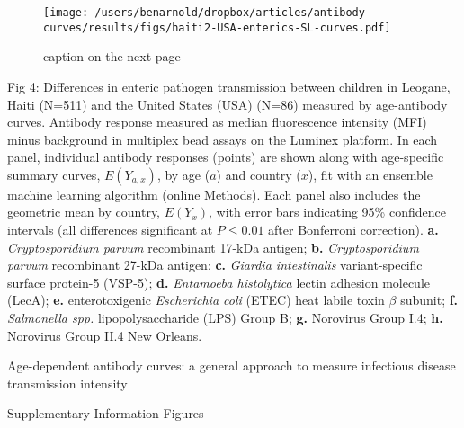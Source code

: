 \documentclass[11pt]{article}
\begin{document}
\begin{figure}[htbp]
\begin{center}
\texttt{[image: /users/benarnold/dropbox/articles/antibody-curves/results/figs/haiti2-USA-enterics-SL-curves.pdf]}
\begin{minipage}{\textwidth}
\caption{caption on the next page}
\label{fig:enterics}
\end{minipage}
\end{center}
\end{figure}

\clearpage
Fig 4: Differences in enteric pathogen transmission between children in Leogane, Haiti (N=511) and the United States (USA) (N=86) measured by age-antibody curves. Antibody response measured as median fluorescence intensity (MFI) minus background in multiplex bead assays on the Luminex platform. In each panel, individual antibody responses (points) are shown along with age-specific summary curves, $E(Y_{a,x})$, by age ($a$) and country ($x$), fit with an ensemble machine learning algorithm (online Methods). Each panel also includes the geometric mean by country, $E(Y_{x})$, with error bars indicating 95\% confidence intervals (all differences significant at $P\leq0.01$ after Bonferroni correction).
\textbf{a.} \textit{Cryptosporidium parvum} recombinant 17-kDa antigen;
\textbf{b.} \textit{Cryptosporidium parvum} recombinant 27-kDa antigen;
\textbf{c.} \textit{Giardia intestinalis} variant-specific surface protein-5 (VSP-5);
\textbf{d.} \textit{Entamoeba histolytica} lectin adhesion molecule (LecA);
\textbf{e.} enterotoxigenic \textit{Escherichia coli} (ETEC) heat labile toxin $\beta$ subunit;
\textbf{f.} \textit{Salmonella spp.} lipopolysaccharide (LPS) Group B;
\textbf{g.} Norovirus Group I.4;
\textbf{h.} Norovirus Group II.4 New Orleans.

\clearpage

{\Large Age-dependent antibody curves: a general approach to measure infectious disease transmission intensity} 

\bigskip
\begin{center}
{\Large Supplementary Information Figures}
\end{center}
\vspace{50pt}

\renewcommand{\figurename}{Supplementary Fig.}
\setcounter{figure}{0} 
\end{document}
